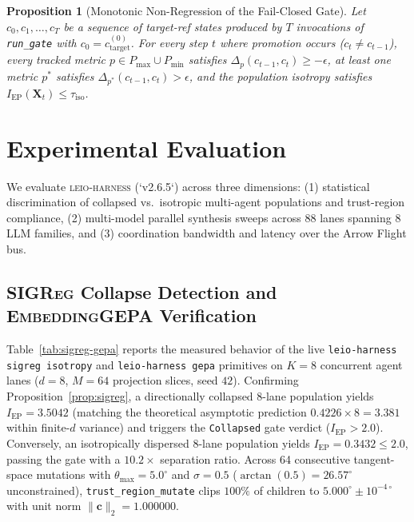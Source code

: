 \documentclass[11pt]{article}
\newtheorem{proposition}{Proposition}
\begin{document}
\begin{proposition}[Monotonic Non-Regression of the Fail-Closed Gate]
\label{prop:gate}
Let $c_0, c_1, \dots, c_T$ be a sequence of target-ref states produced by $T$ invocations of \texttt{run\_gate} with $c_0 = c_{\text{target}}^{(0)}$. For every step $t$ where promotion occurs ($c_t \ne c_{t-1}$), every tracked metric $p \in P_{\max} \cup P_{\min}$ satisfies $\Delta_p(c_{t-1}, c_t) \ge -\epsilon$, at least one metric $p^*$ satisfies $\Delta_{p^*}(c_{t-1}, c_t) > \epsilon$, and the population isotropy satisfies $I_{\text{EP}}(\mathbf{X}_t) \le \tau_{\text{iso}}$.
\end{proposition}

\section{Experimental Evaluation}

We evaluate \textsc{leio-harness} (`v2.6.5`) across three dimensions: (1) statistical discrimination of collapsed vs.\ isotropic multi-agent populations and trust-region compliance, (2) multi-model parallel synthesis sweeps across 88 lanes spanning 8 LLM families, and (3) coordination bandwidth and latency over the Arrow Flight bus.

\subsection{\textsc{SIGReg} Collapse Detection and \textsc{EmbeddingGEPA} Verification}

Table~\ref{tab:sigreg-gepa} reports the measured behavior of the live \texttt{leio-harness sigreg isotropy} and \texttt{leio-harness gepa} primitives on $K=8$ concurrent agent lanes ($d=8$, $M=64$ projection slices, seed $42$). Confirming Proposition~\ref{prop:sigreg}, a directionally collapsed 8-lane population yields $I_{\text{EP}} = 3.5042$ (matching the theoretical asymptotic prediction $0.4226 \times 8 = 3.381$ within finite-$d$ variance) and triggers the \texttt{Collapsed} gate verdict ($I_{\text{EP}} > 2.0$). Conversely, an isotropically dispersed 8-lane population yields $I_{\text{EP}} = 0.3432 \le 2.0$, passing the gate with a $10.2\times$ separation ratio. Across 64 consecutive tangent-space mutations with $\theta_{\max} = 5.0^\circ$ and $\sigma = 0.5$ ($\arctan(0.5) = 26.57^\circ$ unconstrained), \texttt{trust\_region\_mutate} clips $100\%$ of children to $5.000^\circ \pm 10^{-4\circ}$ with unit norm $\|\mathbf{c}\|_2 = 1.000000$.
\end{document}

